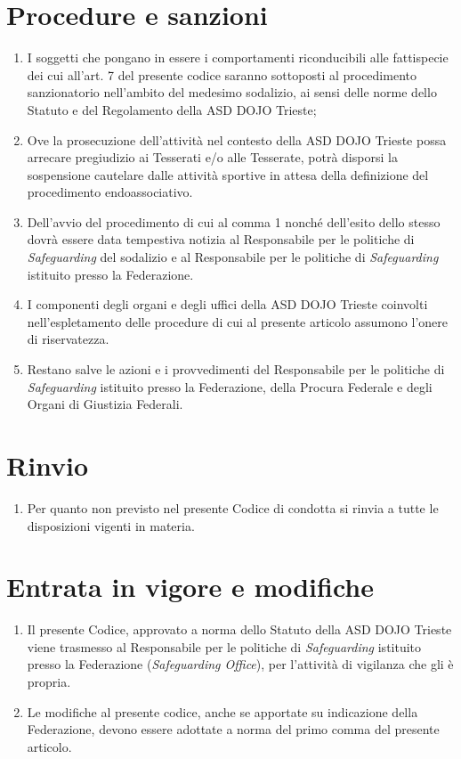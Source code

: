 \documentclass{djtsdoc}
\begin{document}
	\section{Procedure e sanzioni}
	\begin{enumerate}
		\item I soggetti che pongano in essere i comportamenti riconducibili alle fattispecie dei cui all'art. 7 del presente codice saranno sottoposti al procedimento sanzionatorio nell'ambito del medesimo sodalizio, ai sensi delle norme dello Statuto e del Regolamento della ASD DOJO Trieste;
		\item Ove la prosecuzione dell'attività nel contesto della ASD DOJO Trieste possa arrecare pregiudizio ai Tesserati e/o alle Tesserate, potrà disporsi la sospensione cautelare dalle attività sportive in attesa della definizione del procedimento endoassociativo.
		\item Dell'avvio del procedimento di cui al comma 1 nonché dell'esito dello stesso dovrà essere data tempestiva notizia al Responsabile per le politiche di \textit{Safeguarding} del sodalizio e al Responsabile per le politiche di \textit{Safeguarding} istituito presso la Federazione.
		\item I componenti degli organi e degli uffici della ASD DOJO Trieste coinvolti nell'espletamento delle procedure di cui al presente articolo assumono l'onere di riservatezza.
		\item Restano salve le azioni e i provvedimenti del Responsabile per le politiche di \textit{Safeguarding} istituito presso la Federazione, della Procura Federale e degli Organi di Giustizia Federali.
	\end{enumerate}
	
	\section{Rinvio}
	\begin{enumerate}
		\item Per quanto non previsto nel presente Codice di condotta si rinvia a tutte le disposizioni vigenti in materia.
	\end{enumerate}
	
	\section{Entrata in vigore e modifiche}
	\begin{enumerate}
		\item Il presente Codice, approvato a norma dello Statuto della ASD DOJO Trieste viene trasmesso al Responsabile per le politiche di \textit{Safeguarding} istituito presso la Federazione (\textit{Safeguarding Office}), per l'attività di vigilanza che gli è propria.
		\item Le modifiche al presente codice, anche se apportate su indicazione della Federazione, devono essere adottate a norma del primo comma del presente articolo.
	\end{enumerate}
\end{document}

